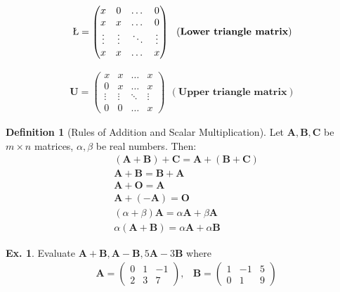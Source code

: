 \documentclass[10pt,a4paper]{book}
\theoremstyle{definition}\newtheorem{definition}{Definition}
\theoremstyle{definition}\newtheorem{fact}{Fact}
\theoremstyle{definition}\newtheorem{ex}{Ex.}
\theoremstyle{definition}\newtheorem{project}{Project}
\theoremstyle{definition}\newtheorem{problem}{Problem}
\theoremstyle{definition}\newtheorem{example}{Example}
\numberwithin{theorem}{chapter}
\numberwithin{corollary}{chapter}
\numberwithin{assumption}{chapter}
\numberwithin{definition}{chapter}
\numberwithin{prop}{chapter}
\numberwithin{notation}{chapter}
\numberwithin{problem}{chapter}
\numberwithin{example}{chapter}
\numberwithin{fact}{chapter}
\numberwithin{ex}{chapter}
\newenvironment{fdefinition}
{\begin{mdframed}\begin{definition}}
		{\end{definition}\end{mdframed}}
\def\A{\mathbf A}
\def\B{\mathbf B}
\def\C{\mathbf C}
\def\O{\mathbf O}
\def\U{\mathbf U}
\begin{document}
	\begin{align*}
		\L = 
		\begin{pmatrix}
			x      & 0      & \dots  & 0      \\
			x      & x      & \dots  & 0      \\
			\vdots & \vdots & \ddots & \vdots \\
			x      & x      & \dots  & x      
		\end{pmatrix} \ \ (\textbf{Lower triangle matrix})
	\end{align*}
	
	\begin{align*}
		\U = 
		\begin{pmatrix}
			x      & x      & \dots  & x      \\
			0      & x      & \dots  & x      \\
			\vdots & \vdots & \ddots & \vdots \\
			0      & 0      & \dots  & x      
		\end{pmatrix} \ \ (\textbf{Upper triangle matrix})
	\end{align*}
	
	\begin{fdefinition}[Rules of Addition and Scalar Multiplication]
		
		Let $\A, \B, \C$ be $m\times n$ matrices, $\alpha, \beta$ be real numbers. Then:
		\begin{align*}
			& (\A + \B) + \C = \A + (\B + \C)            \\
			& \A+ \B = \B + \A                           \\
			& \A+ \O = \A                                \\
			& \A + (-\A) = \O                            \\
			& (\alpha + \beta) \A = \alpha \A + \beta \A \\
			& \alpha (\A+ \B) = \alpha \A + \alpha \B    
		\end{align*}
	\end{fdefinition}
	
	\begin{ex}
		Evaluate $\A+\B, \A - \B, 5\A - 3\B$ where
		\begin{align*}
			&\A= \begin{pmatrix}
				0 & 1  & -1 \\
				2 & 3  & 7  
			\end{pmatrix}, &
			\B = \begin{pmatrix}
				1 & -1 & 5  \\
				0 & 1  & 9  
			\end{pmatrix}
		\end{align*}
	\end{ex}
	
\end{document}
